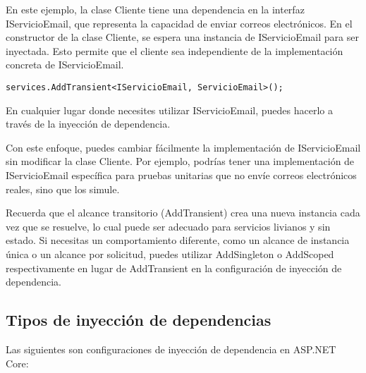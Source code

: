 \documentclass[executivepaper]{article}
\begin{document}
En este ejemplo, la clase Cliente tiene una dependencia en la interfaz IServicioEmail, que representa la capacidad de enviar correos electrónicos. En el constructor de la clase Cliente, se espera una instancia de IServicioEmail para ser inyectada. Esto permite que el cliente sea independiente de la implementación concreta de IServicioEmail.


\begin{lstlisting}
services.AddTransient<IServicioEmail, ServicioEmail>();
\end{lstlisting}

En cualquier lugar donde necesites utilizar IServicioEmail, puedes hacerlo a través de la inyección de dependencia.

Con este enfoque, puedes cambiar fácilmente la implementación de IServicioEmail sin modificar la clase Cliente. Por ejemplo, podrías tener una implementación de IServicioEmail específica para pruebas unitarias que no envíe correos electrónicos reales, sino que los simule.

Recuerda que el alcance transitorio (AddTransient) crea una nueva instancia cada vez que se resuelve, lo cual puede ser adecuado para servicios livianos y sin estado. Si necesitas un comportamiento diferente, como un alcance de instancia única o un alcance por solicitud, puedes utilizar AddSingleton o AddScoped respectivamente en lugar de AddTransient en la configuración de inyección de dependencia.

\subsection*{Tipos de inyección de dependencias}


Las siguientes son configuraciones de inyección de dependencia en ASP.NET Core:
\end{document}
